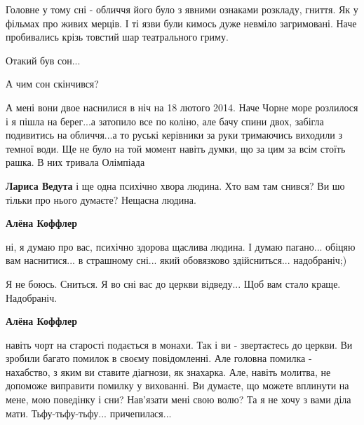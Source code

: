 \begin{itemize}
Головне у тому сні - обличчя його було з явними ознаками розкладу, гниття. Як у
фільмах про живих мерців. І ті язви були кимось дуже невміло загримовані. Наче
пробивались крізь товстий шар театрального гриму.

Отакий був сон...

А чим сон скінчився?


А мені вони двое наснилися в ніч на 18 лютого 2014. Наче Чорне море розлилося
і я пішла на берег...а затопило все по коліно, але бачу спини двох, забігла
подивитись на обличчя...а то руські керівники за руки тримаючись виходили з
темної води. Ще не було на той момент навіть думки, що за цим за всім стоїть
рашка. В них тривала Олімпіада

\begin{itemize} %
\textbf{Лариса Ведута} і ще одна психічно хвора людина. Хто вам там снився? Ви шо тільки про нього думаєте? Нещасна людина.

\textbf{Алёна Коффлер} 

ні, я думаю про вас, психічно здорова щаслива людина. І думаю пагано... обіцяю
вам наснитися... в страшному сні... який обовязково здійсниться... надобраніч;)


Я не боюсь. Сниться. Я во сні вас до церкви відведу... Щоб вам стало краще. Надобраніч.

\textbf{Алёна Коффлер} 

навіть чорт на старості подається в монахи. Так і ви - звертаєтесь до церкви.
Ви зробили багато помилок в своєму повідомленні. Але головна помилка -
нахабство, з яким ви ставите діагнози, як знахарка. Але, навіть молитва, не
допоможе виправити помилку у вихованні. Ви думаєте, що можете вплинути на мене,
мою поведінку і сни? Нав'язати мені свою волю? Та я не хочу з вами діла мати.
Тьфу-тьфу-тьфу... причепилася...

\end{itemize} %



\end{itemize} %
